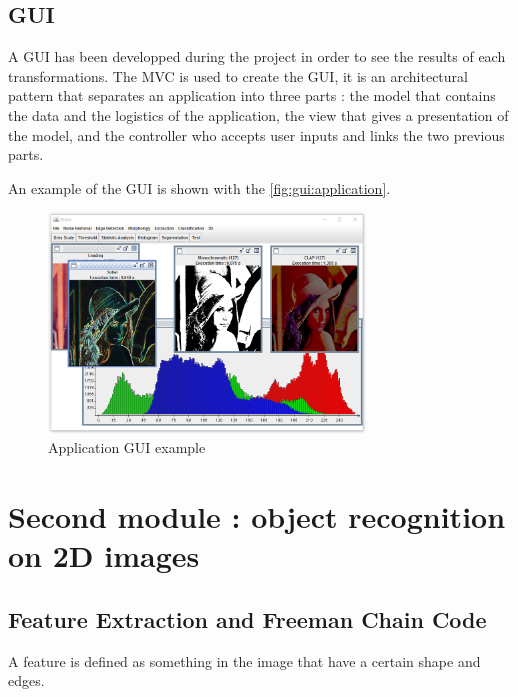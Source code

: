 \subsection{GUI}

A \gls{GUI} has been developped during the project in order to see the results of each transformations. The \gls{MVC} is used to create the \gls{GUI}, it is an architectural pattern that separates an application into three parts : the model that contains the data and the logistics of the application, the view that gives a presentation of the model, and the controller who accepts user inputs and links the two previous parts. 



An example of the \gls{GUI} is shown with the \vref{fig:gui:application}.

\begin{figure}[h]
	\centering
	\includegraphics[width=0.75\textwidth]{images/application/application}
	\caption{Application GUI example}
	\label{fig:gui:application}
\end{figure}





\section{Second module : object recognition on 2D images}



\subsection{Feature Extraction and Freeman Chain Code}


A feature is defined as something in the image that have a certain shape and edges. 


